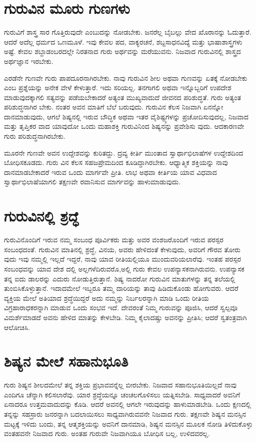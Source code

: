 \section{ಗುರುವಿನ ಮೂರು ಗುಣಗಳು}

ಗುರುವಿಗೆ ಶಾಸ್ತ್ರ ಸಾರ ಗೊತ್ತಿರುವುದೇ ಎಂಬುದನ್ನು ನೋಡಬೇಕು. ಜನರೆಲ್ಲ ಬೈಬಲ್ಲು ವೇದ ಖೊರಾನನ್ನು ಓದುತ್ತಾರೆ. ಆದರೆ ಅದೆಲ್ಲ ಧರ್ಮದ ಒಣಮೂಳೆ. ಇವು ಕೇವಲ ಪದ, ವಾಕ್ಯರಚನೆ, ಶಬ್ದಸಾಧನವಿದ್ಯೆ  ಮತ್ತು ಭಾಷಾಶಾಸ್ತ್ರಗಳು ಅಷ್ಟೆ. ಕೇವಲ ಶಬ್ದಾಡಂಬರದಲ್ಲೇ ನಿರತನಾದ ಗುರು ಅರ್ಥವನ್ನು ಮರೆಯುವನು. ನಿಜವಾದ ಗುರುವಿನಲ್ಲಿ ಶಾಸ್ತ್ರದ ಅರ್ಥಜ್ಞಾನ ಇರಬೇಕು.

ಎರಡೆನೇ ಗುಣವೇ ಗುರು ಪಾಪದೂರನಾಗಿರಬೇಕು. ನಾವು ಗುರುವಿನ ಶೀಲ ಅಥವಾ ಗುಣವನ್ನು ಏತಕ್ಕೆ ನೋಡಬೇಕು ಎಂಬ ಪ್ರಶ್ನೆಯನ್ನು ಅನೇಕ ವೇಳೆ ಕೇಳುತ್ತಾರೆ. ಇದು ಸರಿಯಲ್ಲ. ತನಗಾಗಲಿ ಅಥವಾ ಇನ್ನೊಬ್ಬರಿಗೆ ಉಪದೇಶ ಮಾಡುವುದಕ್ಕಾಗಲಿ ಸತ್ಯವನ್ನು ಪಡೆಯಬೇಕಾದರೆ ಅತ್ಯಂತ ಮುಖ್ಯವಾದುದೆ ಜೀವನದ ಪರಿಶುದ್ಧತೆ. ಗುರು ಅತ್ಯಂತ ಪರಿಶುದ್ಧನಾಗಿರ ಬೇಕು. ನಂತರ ಅವನ ಮಾತಿಗೆ ಬೆಲೆ ಬರುವುದು. ಗುರುವಿನ ಕೆಲಸ ನಿಜವಾಗಿ ಏನನ್ನೋ ದಾನಮಾಡುವುದು, ಆಗಲೆ ಶಿಷ್ಯನಲ್ಲಿ ಇರುವ ಬೌದ್ಧಿಕ ಅಥವಾ ಇತರ ವೈಶಿಷ್ಟ್ಯಗಳನ್ನು ಪ್ರಚೋದಿಸುವುದಲ್ಲ, ನಿಜವಾದ ಮತ್ತು ತೃಪ್ತಿಕರ ವಾದ ಯಾವುದೋ ಒಂದು ಮಹಾಶಕ್ತಿ ಗುರುವಿನಿಂದ ಶಿಷ್ಯನನ್ನು ಪ್ರವೇಶಿಸು ವುದು. ಆದಕಾರಣವೇ ಗುರು ಪರಿಶುದ್ಧನಾಗಿರಬೇಕು.

ಮೂರನೇ ಗುಣವೇ ಅವನ ಉದ್ದೇಶವನ್ನು ಕುರಿತದ್ದು. ದ್ರವ್ಯ ಕೀರ್ತಿ ಮುಂತಾದ ಸ್ವಾರ್ಥಾಭಿಲಾಷೆಗಳ ಉದ್ದೇಶದಿಂದ ಬೋಧಿಸಕೂಡದು. ಗುರು ವಿನ ಕೆಲಸ ಸಹಜಪ್ರೇಮದಿಂದ ಕೂಡಿದ್ದಾಗಿರಬೇಕು. ಆಧ್ಯಾತ್ಮಿಕ ಶಕ್ತಿಯನ್ನು ನಾವು ದಾನಮಾಡಬೇಕಾದರೆ ಇರುವ ಒಂದು ಮಾರ್ಗವೇ ಪ್ರೀತಿ. ಲಾಭ ಅಥವಾ ಕೀರ್ತಿಯ ಯಾವ ವಿಧವಾದ ಸ್ವಾರ್ಥಾಭಿಲಾಷೆಯಾಗಲಿ ತಕ್ಷಣವೇ ರವಾನಿಸುವ ಮಾರ್ಗವನ್ನು ಹಾಳುಮಾಡುವುದು.


\section{ಗುರುವಿನಲ್ಲಿ ಶ್ರದ್ಧೆ}

ಗುರುವಿನೊಂದಿಗೆ ಇರುವ ನಮ್ಮ ಸಂಬಂಧ ಪೂರ್ವಿಕರು ಮತ್ತು ಅವರ ವಂಶಜರೊಂದಿಗೆ ಇರುವ ಪರಸ್ಪರ ಸಂಬಂಧದಂತೆ. ಗುರುವಿನ ಮಾತಿನಲ್ಲಿ ಶ್ರದ್ಧೆ, ವಿನಯ, ಅವರು ಹೇಳಿದಂತೆ ಕೇಳುವುದು, ಅವರಿಗೆ ಗೌರವ ತೋರು ವುದು ಇವು ನಮ್ಮಲ್ಲಿ ಇಲ್ಲದೆ ಇದ್ದರೆ, ನಾವು ಯಾವ ರೀತಿಯಲ್ಲಿಯೂ ಮುಂದುವರಿಯಲಾರೆವು. ಇಂತಹ ಪರಸ್ಪರ ಸಂಬಂಧವನ್ನು ಯಾವ ದೇಶ ದಲ್ಲಿ ಅಲ್ಲಗಳೆದಿರುವರೊ,ಅಲ್ಲಿ ಗುರು ಕೇವಲ ಉಪನ್ಯಾಸಕನಾಗಿರುವನು. ಉಪನ್ಯಾಸಕ ತನ್ನ ಐದು ಡಾಲರನ್ನು ಎದುರು ನೋಡುತ್ತಿರುತ್ತಾನೆ. ಶಿಷ್ಯ ನಾದರೋ ಗುರುವಿನ ಮಾತುಗಳನ್ನು ತನ್ನ ತಲೆಯಲ್ಲಿ ತುಂಬಿಸಿಕೊಳ್ಳುತ್ತಾನೆ. ಇದಾದಮೇಲೆ ಇಬ್ಬರೂ ತಮ್ಮ ದಾರಿಯನ್ನು ತಾವು ಹಿಡಿದುಕೊಂಡು ಹೋಗುವರು. ಆದರೆ ವ್ಯಕ್ತಿಯ ಮೇಲೆ ಅತಿಯಾದ ಶ್ರದ್ಧೆಯಿದ್ದರೆ ಅದು ನಮ್ಮನ್ನು ನಿರ್ಬಲರನ್ನಾಗಿ ಮಾಡಿ ಒಂದು ರೀತಿಯ ವಿಗ್ರಹಾರಾಧಕರನ್ನಾಗಿ ಮಾಡುವ ಒಂದು ಸಂಭವ ಇದೆ. ದೇವರಂತೆ ನಿಮ್ಮ ಗುರುವನ್ನು ಪೂಜಿಸಿ, ಆದರೆ ಸ್ವಲ್ಪವೂ ವಿಮರ್ಶೆಮಾಡದೆ ಅವನು ಹೇಳಿದ ಮಾತನ್ನು ಕೇಳಬೇಡಿ. ನಿಮ್ಮ ಕೈಲಾದಷ್ಚು ಅವನನ್ನು ಪ್ರೀತಿಸಿ; ಆದರೆ ಸ್ವತಂತ್ರವಾಗಿ ಆಲೋಚಿಸಿ.


\section{ಶಿಷ್ಯನ ಮೇಲೆ ಸಹಾನುಭೂತಿ}

ಗುರು ಶಿಷ್ಯನ ಶೀಲದಮೇಲೆ ತನ್ನ ಶಕ್ತಿಯ ಪ್ರಭಾವವನ್ನೆಲ್ಲ ಬೀರಬೇಕು. ನಿಜವಾದ ಸಹಾನುಭೂತಿಯಿಲ್ಲದೆ ನಾವು ಎಂದಿಗೂ ಚೆನ್ನಾಗಿ ಕಲಿಸಲಾರೆವು. ಯಾರ ಶ್ರದ್ಧೆಯನ್ನೂ ಚಂಚಲಗೊಳಿಸಲು ಯತ್ನಿಸಬೇಡಿ. ಸಾಧ್ಯವಾದರೆ ಅವನಿಗೆ ಏನಾದರೂ ಉತ್ತಮವಾದುದನ್ನು ಕೊಡಿ. ಆದರೆ ಅವನಲ್ಲಿ ಆಗಲೇ ಇರುವುದನ್ನು ಹಾಳುಮಾಡಬೇಡಿ. ಒಂದು ಕ್ಷಣದಲ್ಲಿ ತನ್ನನ್ನು ಸಹಸ್ರಾರು ಜನರನ್ನಾಗಿ ಬದಲಾಯಿಸಲು ಸಾಧ್ಯವಾಗಿರುವವನೇ ನಿಜವಾದ ಗುರು. ತಕ್ಷಣವೇ ಶಿಷ್ಯನ ಮನಸ್ಸಿನ ಮಟ್ಟಕ್ಕೆ ಇಳಿದು ಬಂದು, ತನ್ನ ಆತ್ಮಶಕ್ತಿಯನ್ನು ಅವನಿಗೆ ದಾನಮಾಡಿ, ಶಿಷ್ಯನ ಮನಸ್ಸಿನ ಮೂಲಕ ನೋಡಿ ತಿಳಿದುಕೊಳ್ಳು ವಂತಹವನೇ ನಿಜವಾದ ಗುರು. ಅಂತಹ ಗುರುವೇ ನಿಜವಾಗಿಯೂ ಬೋಧಿಸ ಬಲ್ಲ, ಉಳಿದವರಲ್ಲ.

